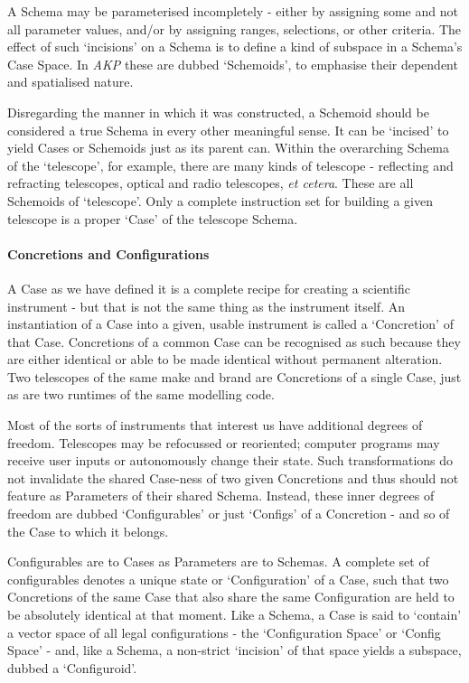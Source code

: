 \documentclass[a4paper,11pt,oneside]{book}
\begin{document}
A Schema may be parameterised incompletely - either by assigning some and not all parameter values, and/or by assigning ranges, selections, or other criteria. The effect of such `incisions' on a Schema is to define a kind of subspace in a Schema's Case Space. In \textit{AKP} these are dubbed `Schemoids', to emphasise their dependent and spatialised nature.

Disregarding the manner in which it was constructed, a Schemoid should be considered a true Schema in every other meaningful sense. It can be `incised' to yield Cases or Schemoids just as its parent can. Within the overarching Schema of the `telescope', for example, there are many kinds of telescope - reflecting and refracting telescopes, optical and radio telescopes, \textit{et cetera}. These are all Schemoids of `telescope'. Only a complete instruction set for building a given telescope is a proper `Case' of the telescope Schema.

\paragraph{Concretions and Configurations}

A Case as we have defined it is a complete recipe for creating a scientific instrument - but that is not the same thing as the instrument itself. An instantiation of a Case into a given, usable instrument is called a `Concretion' of that Case. Concretions of a common Case can be recognised as such because they are either identical or able to be made identical without permanent alteration. Two telescopes of the same make and brand are Concretions of a single Case, just as are two runtimes of the same modelling code.

Most of the sorts of instruments that interest us have additional degrees of freedom. Telescopes may be refocussed or reoriented; computer programs may receive user inputs or autonomously change their state. Such transformations do not invalidate the shared Case-ness of two given Concretions and thus should not feature as Parameters of their shared Schema. Instead, these inner degrees of freedom are dubbed `Configurables' or just `Configs' of a Concretion - and so of the Case to which it belongs.

Configurables are to Cases as Parameters are to Schemas. A complete set of configurables denotes a unique state or `Configuration' of a Case, such that two Concretions of the same Case that also share the same Configuration are held to be absolutely identical at that moment. Like a Schema, a Case is said to `contain' a vector space of all legal configurations - the `Configuration Space' or `Config Space' - and, like a Schema, a non-strict `incision' of that space yields a subspace, dubbed a `Configuroid'.
\end{document}
